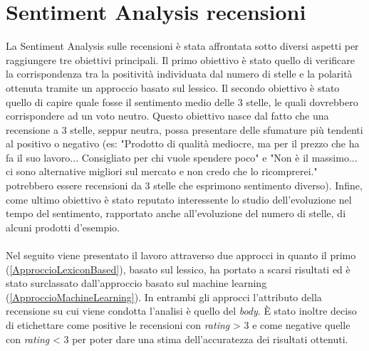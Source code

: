\section{Sentiment Analysis recensioni}\label{SentimentAnalysis}
La Sentiment Analysis sulle recensioni è stata affrontata sotto diversi aspetti per raggiungere tre obiettivi principali. Il primo obiettivo è stato quello di verificare la corrispondenza tra la positività individuata dal numero di stelle e la polarità ottenuta tramite un approccio basato sul lessico. Il secondo obiettivo è stato quello di capire quale fosse il sentimento medio delle 3 stelle, le quali dovrebbero corrispondere ad un voto neutro. Questo obiettivo nasce dal fatto che una recensione a 3 stelle, seppur neutra, possa presentare delle sfumature più tendenti al positivo o negativo (es: "Prodotto di qualità mediocre, ma per il prezzo che ha fa il suo lavoro... Consigliato per chi vuole spendere poco" e "Non è il massimo... ci sono alternative migliori sul mercato e non credo che lo ricomprerei." potrebbero essere recensioni da 3 stelle che esprimono sentimento diverso). Infine, come ultimo obiettivo è stato reputato interessente lo studio dell'evoluzione nel tempo del sentimento, rapportato anche all'evoluzione del numero di stelle, di alcuni prodotti d'esempio. 
\\\\
Nel seguito viene presentato il lavoro attraverso due approcci in quanto il primo (\ref{ApproccioLexiconBased}), basato sul lessico, ha portato a scarsi risultati ed è stato surclassato dall'approccio basato sul machine learning (\ref{ApproccioMachineLearning}). %
In entrambi gli approcci l'attributo della recensione su cui viene condotta l'analisi è quello del \textit{body}. È stato inoltre deciso di etichettare come positive le recensioni con \textit{rating} > 3 e come negative quelle con \textit{rating} < 3 per poter dare una stima dell'accuratezza dei risultati ottenuti.


